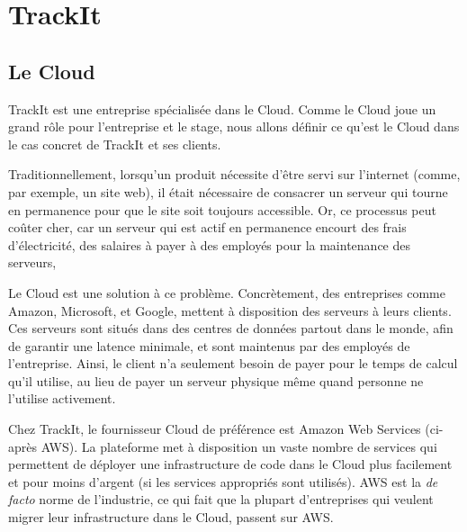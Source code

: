 
\thispagestyle{fancy}

\section{TrackIt}

\subsection*{Le Cloud}

\begin{flushleft}
  TrackIt est une entreprise spécialisée dans le Cloud.
  Comme le Cloud joue un grand rôle pour l'entreprise et
  le stage, nous allons définir ce qu'est le Cloud dans
  le cas concret de TrackIt et ses clients.
\end{flushleft}

\begin{flushleft}
  Traditionnellement, lorsqu'un produit nécessite d'être
  servi sur l'internet (comme, par exemple, un site web),
  il était nécessaire de consacrer un serveur qui tourne
  en permanence pour que le site soit toujours accessible.
  Or, ce processus peut coûter cher, car un serveur qui est
  actif en permanence encourt des frais d'électricité,
  des salaires à payer à des employés pour la maintenance
  des serveurs, \scetc{}
\end{flushleft}

\begin{flushleft}
  Le Cloud est une solution à ce problème. Concrètement,
  des entreprises comme Amazon, Microsoft, et Google,
  mettent à disposition des serveurs à leurs clients.
  Ces serveurs sont situés dans des centres de données
  partout dans le monde, afin de garantir une latence minimale,
  et sont maintenus par des employés de l'entreprise.
  Ainsi, le client n'a seulement besoin de payer pour
  le temps de calcul qu'il utilise, au lieu de payer
  un serveur physique même quand personne ne l'utilise
  activement.
\end{flushleft}

\begin{flushleft}
  Chez TrackIt, le fournisseur Cloud de préférence est
  Amazon Web Services (ci-après AWS). La plateforme met à disposition
  un vaste nombre de services qui permettent de déployer une
  infrastructure de code dans le Cloud plus facilement et
  pour moins d'argent (si les services appropriés sont utilisés).
  AWS est la \textit{de facto} norme de l'industrie, ce qui fait
  que la plupart d'entreprises qui veulent migrer leur infrastructure
  dans le Cloud, passent sur AWS.\@
\end{flushleft}

